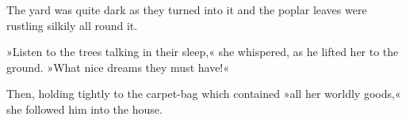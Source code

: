 The yard was quite dark as they turned into it and the poplar leaves were rustling silkily all round it.

»Listen to the trees talking in their sleep,« she whispered, as he lifted her to the ground. »What nice dreams they must have!«

Then, holding tightly to the carpet-bag which contained »all her worldly goods,« she followed him into the house.